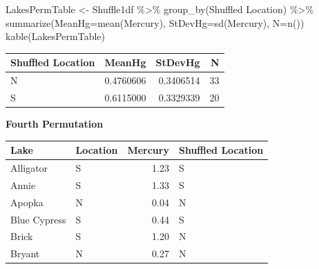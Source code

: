 \documentclass[
  letterpaper,
  DIV=11,
  numbers=noendperiod]{scrreprt}
\newenvironment{Shaded}{\begin{snugshade}}{\end{snugshade}}
\newcommand{\AttributeTok}[1]{\textcolor[rgb]{0.40,0.45,0.13}{#1}}
\newcommand{\DecValTok}[1]{\textcolor[rgb]{0.68,0.00,0.00}{#1}}
\newcommand{\DocumentationTok}[1]{\textcolor[rgb]{0.37,0.37,0.37}{\textit{#1}}}
\newcommand{\FunctionTok}[1]{\textcolor[rgb]{0.28,0.35,0.67}{#1}}
\newcommand{\NormalTok}[1]{\textcolor[rgb]{0.00,0.23,0.31}{#1}}
\newcommand{\OtherTok}[1]{\textcolor[rgb]{0.00,0.23,0.31}{#1}}
\newcommand{\SpecialCharTok}[1]{\textcolor[rgb]{0.37,0.37,0.37}{#1}}
\newcommand{\StringTok}[1]{\textcolor[rgb]{0.13,0.47,0.30}{#1}}
\begin{document}
\begin{Shaded}
\begin{Highlighting}[]
\NormalTok{LakesPermTable }\OtherTok{\textless{}{-}}\NormalTok{ Shuffle1df }\SpecialCharTok{\%\textgreater{}\%} \FunctionTok{group\_by}\NormalTok{(}\StringTok{\textasciigrave{}}\AttributeTok{Shuffled Location}\StringTok{\textasciigrave{}}\NormalTok{) }\SpecialCharTok{\%\textgreater{}\%} \FunctionTok{summarize}\NormalTok{(}\AttributeTok{MeanHg=}\FunctionTok{mean}\NormalTok{(Mercury), }\AttributeTok{StDevHg=}\FunctionTok{sd}\NormalTok{(Mercury),  }\AttributeTok{N=}\FunctionTok{n}\NormalTok{())}
\FunctionTok{kable}\NormalTok{(LakesPermTable)}
\end{Highlighting}
\end{Shaded}

\begin{longtable}[]{@{}lrrr@{}}
\toprule\noalign{}
Shuffled Location & MeanHg & StDevHg & N \\
\midrule\noalign{}
\endhead
\bottomrule\noalign{}
\endlastfoot
N & 0.4760606 & 0.3406514 & 33 \\
S & 0.6115000 & 0.3329339 & 20 \\
\end{longtable}

\textbf{Fourth Permutation}

\begin{Shaded}
\end{Shaded}

\begin{longtable}[]{@{}llrl@{}}
\toprule\noalign{}
Lake & Location & Mercury & Shuffled Location \\
\midrule\noalign{}
\endhead
\bottomrule\noalign{}
\endlastfoot
Alligator & S & 1.23 & S \\
Annie & S & 1.33 & S \\
Apopka & N & 0.04 & N \\
Blue Cypress & S & 0.44 & S \\
Brick & S & 1.20 & N \\
Bryant & N & 0.27 & N \\
\end{longtable}
\end{document}
